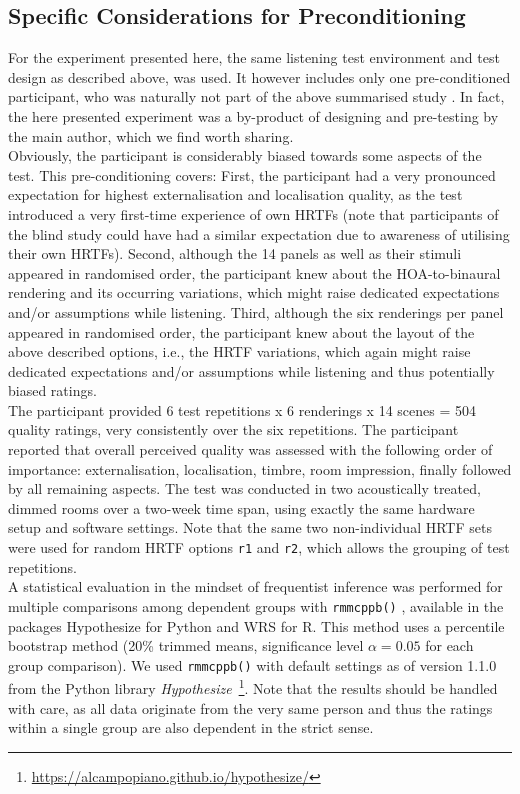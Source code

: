 \documentclass[conference]{IEEEtran}
\def\NewL{\\\noindent\hspace*{5mm}}
\begin{document}
\subsection{Specific Considerations for Preconditioning}
%
For the experiment presented here, the same listening test environment and test design as described above, was used.
%
It however includes only one pre-conditioned participant, who was naturally not part of the above summarised study \cite{Schultz2023_Acta}.
%
In fact, the here presented experiment was a by-product of designing and pre-testing by the main author, which we find worth sharing.
%
\NewL Obviously, the participant is considerably biased towards some aspects of the test.
%
This pre-conditioning covers:
%
First, the participant had a very pronounced expectation for highest externalisation and localisation quality, as the test introduced a very first-time experience of own HRTFs (note that participants of the blind study could have had a similar expectation due to awareness of utilising their own HRTFs).
%
Second, although the 14 panels as well as their stimuli appeared in randomised order, the participant knew about the HOA-to-binaural rendering and its occurring variations, which might raise dedicated expectations and/or assumptions while listening.
%
Third, although the six renderings per panel appeared in randomised order, the participant knew about the layout of the above described options, i.e., the HRTF variations, which again might raise dedicated expectations and/or assumptions while listening and thus potentially biased ratings.
%
\NewL The participant provided 6 test repetitions x 6 renderings x 14 scenes = 504 quality ratings, very consistently over the six repetitions.
%
The participant reported that overall perceived quality was assessed with the following order of importance: externalisation, localisation, timbre, room impression, finally followed by all remaining aspects.
%
The test was conducted in two acoustically treated, dimmed rooms over a two-week time span, using exactly the same hardware setup and software settings.
%
Note that the same two non-individual HRTF sets were used for random HRTF options \texttt{r1} and \texttt{r2}, which allows the grouping of test repetitions.
%
\NewL A statistical evaluation in the mindset of frequentist inference was performed for multiple comparisons among dependent groups with \verb|rmmcppb()| \cite[cf. Ch.~8.3.3]{Wilcox2022}, available in the packages Hypothesize for Python and WRS for R.
%
This method uses a percentile bootstrap method (20\% trimmed means, significance level $\alpha = 0.05$ for each group comparison).
%
We used \verb|rmmcppb()| with default settings as of version 1.1.0 from the Python library \textit{Hypothesize}~\cite{Campopiano2020_Hypothesize}\footnote{\url{https://alcampopiano.github.io/hypothesize/}}.
%
Note that the results should be handled with care, as all data originate from the very same person and thus the ratings within a single group are also dependent in the strict sense.
\end{document}
